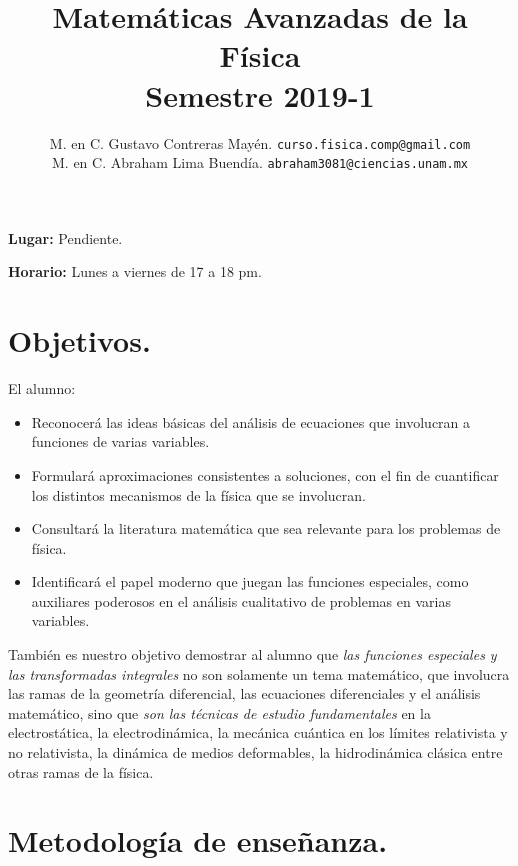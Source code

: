 \documentclass[12pt]{article}
\author{M. en C. Gustavo Contreras Mayén. \texttt{curso.fisica.comp@gmail.com}\\
M. en C. Abraham Lima Buendía. \texttt{abraham3081@ciencias.unam.mx}}
\title{Matemáticas Avanzadas de la Física \\ {\large Semestre 2019-1}}
\date{ }
\begin{document}
\vspace{-4cm}
\renewcommand\labelenumii{\theenumi.{\arabic{enumii}}}
\maketitle
\fontsize{14}{14}\selectfont
\textbf{Lugar: } Pendiente.
\par
\textbf{Horario: } Lunes a viernes de 17 a 18 pm.
\section{Objetivos.}
El alumno:
\begin{itemize}
\setlength{\itemsep}{0mm}
\item Reconocerá las ideas básicas del análisis de ecuaciones que involucran a funciones de varias variables.
\item Formulará aproximaciones consistentes a soluciones, con el fin de cuantificar los distintos mecanismos de la física que se involucran.
\item Consultará la literatura matemática que sea relevante para los problemas de física.
\item Identificará el papel moderno que juegan las funciones especiales, como auxiliares poderosos en el análisis cualitativo de problemas en varias variables.
\end{itemize}
También es nuestro objetivo demostrar al alumno que \emph{las funciones especiales y las transformadas integrales} no son solamente un tema matemático, que involucra las ramas de la geometría diferencial, las ecuaciones diferenciales y el análisis matemático, sino que \emph{son las técnicas de estudio fundamentales} en la electrostática, la electrodinámica, la mecánica cuántica en los límites relativista y  no relativista, la dinámica de medios deformables, la hidrodinámica clásica entre otras ramas de la física.
\section{Metodología de enseñanza.}
\end{document}
